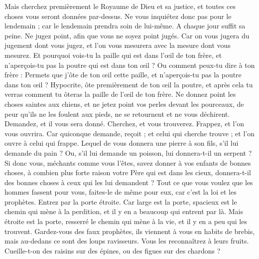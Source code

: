 \begin{multicols}{2}
Mais cherchez premièrement le Royaume de Dieu et sa justice, et toutes ces choses vous seront données par-dessus.
Ne vous inquiétez donc pas pour le lendemain ; car le lendemain prendra soin de lui-même. A chaque jour suffit sa peine.
\VerseOne{}Ne jugez point, afin que vous ne soyez point jugés.
Car on vous jugera du jugement dont vous jugez, et l’on vous mesurera avec la mesure dont vous mesurez.
Et pourquoi vois-tu la paille qui est dans l’œil de ton frère, et n’aperçois-tu pas la poutre qui est dans ton œil ?
Ou comment peux-tu dire à ton frère : Permets que j'ôte de ton œil cette paille, et n’aperçois-tu pas la poutre dans ton œil ?
Hypocrite, ôte premièrement de ton œil la poutre, et après cela tu verras comment tu ôteras la paille de l’œil de ton frère.
Ne donnez point les choses saintes aux chiens, et ne jetez point vos perles devant les pourceaux, de peur qu'ils ne les foulent aux pieds, ne se retournent et ne vous déchirent.
Demandez, et il vous sera donné. Cherchez, et vous trouverez. Frappez, et l’on vous ouvrira.
Car quiconque demande, reçoit ; et celui qui cherche trouve ; et l’on ouvre à celui qui frappe.
Lequel de vous donnera une pierre à son fils, s'il lui demande du pain ?
Ou, s’il lui demande un poisson, lui donnera-t-il un serpent ?
Si donc vous, méchants comme vous l’êtes, savez donner à vos enfants de bonnes choses, à combien plus forte raison votre Père qui est dans les cieux, donnera-t-il des bonnes choses à ceux qui les lui demandent ?
Tout ce que vous voulez que les hommes fassent pour vous, faites-le de même pour eux, car c’est la loi et les prophètes.
Entrez par la porte étroite. Car large est la porte, spacieux est le chemin qui mène à la perdition, et il y en a beaucoup qui entrent par là.
Mais étroite est la porte, resserré le chemin qui mène à la vie, et il y en a peu qui les trouvent.
Gardez-vous des faux prophètes, ils viennent à vous en habits de brebis, mais au-dedans ce sont des loups ravisseurs.
Vous les reconnaîtrez à leurs fruits. Cueille-t-on des raisins sur des épines, ou des figues sur des chardons ?

\end{multicols}
